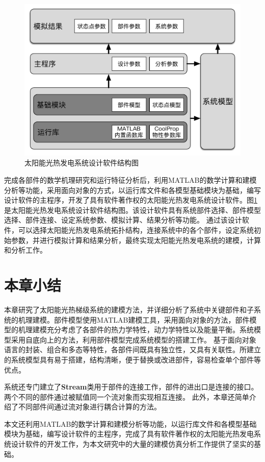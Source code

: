 \begin{figure}[htbp]
	\centering
	\includegraphics[width = 0.8\columnwidth]{fig/SystemFlow}
	\caption{太阳能光热发电系统设计软件结构图}
	\label{fig:SystemFlow}
\end{figure}

完成各部件的数学机理研究和运行特征分析后，利用MATLAB的数学计算和建模分析等功能，采用面向对象的方式，以运行库文件和各模型基础模块为基础，编写设计软件的主程序，开发了具有软件著作权的太阳能光热发电系统设计软件。图\ref{fig:SystemFlow}是太阳能光热发电系统设计软件结构图。该设计软件具有系统部件选择、部件模型选择、部件连接、设定系统参数、模拟计算、结果分析等功能。
通过该设计软件，可以选择太阳能光热发电系统拓扑结构，连接系统中的各个部件，设定系统初始参数，并进行模拟计算和结果分析，最终实现太阳能光热发电系统的建模，计算和分析工作。

\section{本章小结}

本章研究了太阳能光热梯级系统的建模方法，并详细分析了系统中关键部件和子系统的机理建模。部件模型使用MATLAB建模工具，采用面向对象的方法，部件模型的机理建模充分考虑了各部件的热力学特性，动力学特性以及能量平衡。系统模型采用自底向上的方法，利用部件模型完成系统模型的搭建工作。
基于面向对象语言的封装、组合和多态等特性，各部件间既具有独立性，又具有关联性。所建立的系统模型具有易于搭建，结构清晰，便于替换或改进部件，容易检查单个部件等优点。

系统还专门建立了\textbf{Stream}类用于部件的连接工作，部件的进出口是连接的接口。两个不同的部件通过被赋值同一个流对象而实现相互连接。
此外，本章还简单介绍了不同部件间通过流对象进行耦合计算的方法。

本文还利用MATLAB的数学计算和建模分析等功能，以运行库文件和各模型基础模块为基础，编写设计软件的主程序，完成了具有软件著作权的太阳能光热发电系统设计软件的开发工作，为本文研究中的大量的建模仿真分析工作提供了坚实的基础。

